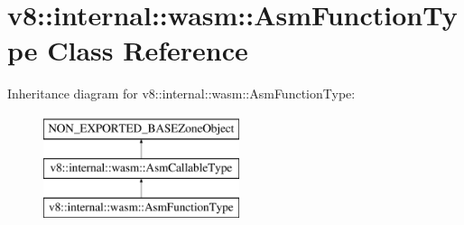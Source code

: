 \hypertarget{classv8_1_1internal_1_1wasm_1_1AsmFunctionType}{}\section{v8\+:\+:internal\+:\+:wasm\+:\+:Asm\+Function\+Type Class Reference}
\label{classv8_1_1internal_1_1wasm_1_1AsmFunctionType}
Inheritance diagram for v8\+:\+:internal\+:\+:wasm\+:\+:Asm\+Function\+Type\+:\begin{figure}[H]
\begin{center}
\leavevmode
\includegraphics[height=3.000000cm]{classv8_1_1internal_1_1wasm_1_1AsmFunctionType}
\end{center}
\end{figure}
